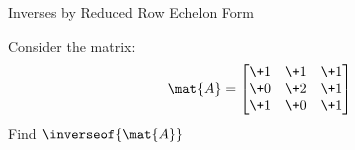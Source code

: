 \documentclass{beamer}
\begin{document}
\begin{frame}{Inverses by Reduced Row Echelon Form}
\begin{example}
\begin{overprint}
%
Consider the matrix:
\begin{equation*}
\mat{A}=
\begin{bmatrix}
\+1 & \+1 & \+1 \\
\+0 & \+2 & \+1 \\
\+1 & \+0 & \+1 \\
\end{bmatrix}
\end{equation*}
Find $\inverseof{\mat{A}}$

\end{overprint}
\end{example}
\end{frame}
\end{document}
